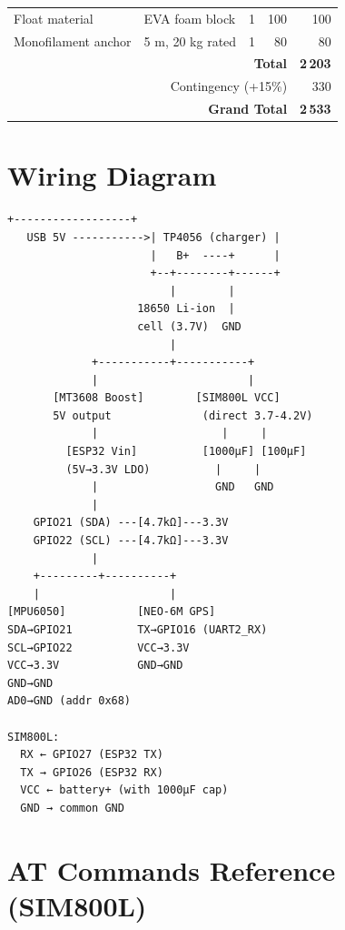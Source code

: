 \begin{table}[H]
\begin{tabularx}{\textwidth}{l X r r r}
Float material        & EVA foam block                      & 1   & 100   & 100   \\
Monofilament anchor   & 5 m, 20 kg rated                   & 1   & 80    & 80    \\
\midrule
\multicolumn{4}{r}{\textbf{Total}}                                    & \textbf{2\,203} \\
\multicolumn{4}{r}{Contingency (+15\%)}                               & 330   \\
\multicolumn{4}{r}{\textbf{Grand Total}}                              & \textbf{2\,533} \\
\bottomrule
\end{tabularx}
\end{table}

\chapter{Wiring Diagram}
\label{app:wiring}

\begin{lstlisting}[language={}, caption={ASCII wiring diagram – WaveGuard V4}]
                      +------------------+
   USB 5V ----------->| TP4056 (charger) |
                      |   B+  ----+      |
                      +--+--------+------+
                         |        |
                    18650 Li-ion  |
                    cell (3.7V)  GND
                         |
             +-----------+-----------+
             |                       |
       [MT3608 Boost]        [SIM800L VCC]
       5V output              (direct 3.7-4.2V)
             |                   |     |
         [ESP32 Vin]          [1000µF] [100µF]
         (5V→3.3V LDO)          |     |
             |                  GND   GND
             |
    GPIO21 (SDA) ---[4.7kΩ]---3.3V
    GPIO22 (SCL) ---[4.7kΩ]---3.3V
             |
    +---------+----------+
    |                    |
[MPU6050]           [NEO-6M GPS]
SDA→GPIO21          TX→GPIO16 (UART2_RX)
SCL→GPIO22          VCC→3.3V
VCC→3.3V            GND→GND
GND→GND
AD0→GND (addr 0x68)

SIM800L:
  RX ← GPIO27 (ESP32 TX)
  TX → GPIO26 (ESP32 RX)
  VCC ← battery+ (with 1000µF cap)
  GND → common GND
\end{lstlisting}

\chapter{AT Commands Reference (SIM800L)}
\label{app:atcmds}

